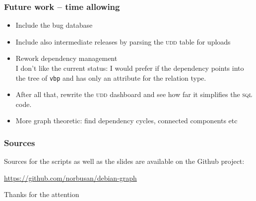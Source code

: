 \documentclass[hyperref]{beamer}
\newcommand{\acro}[1]{\textsc{\MakeLowercase{#1}}}
\begin{document}
\begin{frame}
  \frametitle{Future work -- time allowing}
  \begin{itemize}
  \item Include the bug database
  \item Include also intermediate releases by parsing the \acro{UDD}
    table for uploads
  \item Rework dependency management\\
    I don't like the current status: I would prefer if the dependency
    points into the tree of \texttt{vbp} and has only an attribute for
    the relation type.
  \item After all that, rewrite the \acro{UDD} dashboard and see how
    far it simplifies the \acro{SQL} code.
  \item More graph theoretic: find dependency cycles, connected
    components etc
  \end{itemize}
\end{frame}

\begin{frame}
  \frametitle{Sources}
  Sources for the scripts as well as the slides are available on the
  Github project:
  \begin{center}
    \url{https://github.com/norbusan/debian-graph}
  \end{center}

  \pause
  \begin{center}
    Thanks for the attention
  \end{center}
\end{frame}
\end{document}
